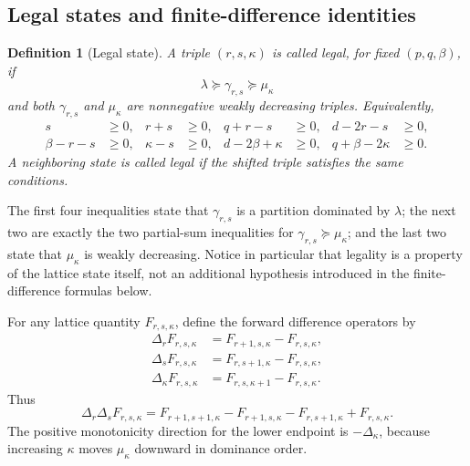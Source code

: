 \documentclass[10pt,a4paper]{amsart}
\newtheorem{definition}[theorem]{Definition}
\begin{document}
\subsection{Legal states and finite-difference identities}

\begin{definition}[Legal state]
\label{def:legal-state}
A triple \((r,s,\kappa)\) is called \emph{legal}, for fixed \((p,q,\beta)\), if
\begin{equation*}
\lambda\succcurlyeq\gamma_{r,s}\succcurlyeq\mu_\kappa
\end{equation*}
and both \(\gamma_{r,s}\) and \(\mu_\kappa\) are nonnegative weakly decreasing triples.
Equivalently,
\begin{align*}
s&\ge0,
& r+s&\ge0,
& q+r-s&\ge0,
& d-2r-s&\ge0,\\
\beta-r-s&\ge0,
& \kappa-s&\ge0,
& d-2\beta+\kappa&\ge0,
& q+\beta-2\kappa&\ge0.
\end{align*}
A neighboring state is called legal if the shifted triple satisfies the same conditions.
\end{definition}

The first four inequalities state that \(\gamma_{r,s}\) is a partition dominated by \(\lambda\); the next two are exactly the two partial-sum inequalities for
\(\gamma_{r,s}\succcurlyeq\mu_\kappa\); and the last two state that \(\mu_\kappa\) is weakly decreasing.  Notice in particular that legality is a property of the lattice state itself, not an additional hypothesis introduced in the finite-difference formulas below.

For any lattice quantity \(F_{r,s,\kappa}\), define the forward difference operators by
\begin{align*}
\Delta_rF_{r,s,\kappa}
&=
F_{r+1,s,\kappa}-F_{r,s,\kappa},\\
\Delta_sF_{r,s,\kappa}
&=
F_{r,s+1,\kappa}-F_{r,s,\kappa},\\
\Delta_\kappa F_{r,s,\kappa}
&=
F_{r,s,\kappa+1}-F_{r,s,\kappa}.
\end{align*}
Thus
\begin{equation*}
\Delta_r\Delta_sF_{r,s,\kappa}
=
F_{r+1,s+1,\kappa}
-F_{r+1,s,\kappa}
-F_{r,s+1,\kappa}
+F_{r,s,\kappa}.
\end{equation*}
The positive monotonicity direction for the lower endpoint is \(-\Delta_\kappa\), because increasing \(\kappa\) moves \(\mu_\kappa\) downward in dominance order.
\end{document}
